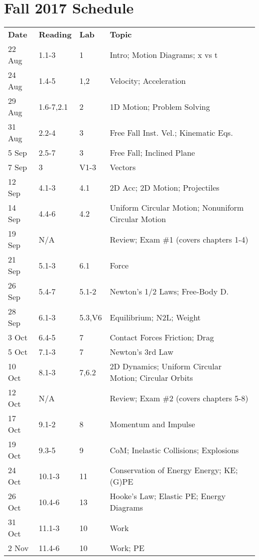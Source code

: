 \documentclass[12pt]{article}
\begin{document}
\section*{Fall 2017 Schedule}
\begin{tabu}{llll}
{\bf Date} & {\bf Reading} & {\bf Lab} & {\bf Topic} \\
22 Aug   & 1.1-3     & 1      & Intro; Motion Diagrams; x vs t \\
24 Aug   & 1.4-5     & 1,2    & Velocity; Acceleration \\
29 Aug   & 1.6-7,2.1 & 2      & 1D Motion; Problem Solving \\
31 Aug   & 2.2-4     & 3      & Free Fall   Inst. Vel.; Kinematic Eqs. \\
5 Sep    & 2.5-7     & 3      & Free Fall; Inclined Plane \\
7 Sep    & 3         & V1-3  & Vectors \\
12 Sep   & 4.1-3     & 4.1    & 2D Acc; 2D Motion; Projectiles \\
14 Sep   & 4.4-6     & 4.2    & Uniform Circular Motion; Nonuniform Circular Motion \\
\rowfont{\color{red}}
19 Sep   & N/A       &        & Review; Exam \#1 (covers chapters 1-4) \\
21 Sep   & 5.1-3     & 6.1    & Force \\
26 Sep   & 5.4-7     & 5.1-2  & Newton's 1/2 Laws; Free-Body D. \\
28 Sep   & 6.1-3     & 5.3,V6 & Equilibrium; N2L; Weight \\
3 Oct    & 6.4-5     & 7      & Contact Forces Friction; Drag \\
5 Oct    & 7.1-3     & 7      & Newton's 3rd Law \\
10 Oct   & 8.1-3     & 7,6.2  & 2D Dynamics; Uniform Circular Motion; Circular Orbits \\
\rowfont{\color{red}}
12 Oct   & N/A       &        & Review; Exam \#2 (covers chapters 5-8) \\
17 Oct   & 9.1-2     & 8      & Momentum and Impulse \\
19 Oct   & 9.3-5     & 9      & CoM; Inelastic Collisions; Explosions \\
24 Oct   & 10.1-3    & 11     & Conservation of Energy Energy; KE; (G)PE \\
26 Oct   & 10.4-6    & 13     & Hooke's Law; Elastic PE; Energy Diagrams \\
31 Oct   & 11.1-3    & 10     & Work \\ 
2 Nov    & 11.4-6    & 10     & Work; PE \\

\end{tabu}
\end{document}
